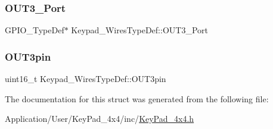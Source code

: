\subsubsection{\texorpdfstring{O\+U\+T3\+\_\+\+Port}{OUT3\_Port}}
{\footnotesize\ttfamily G\+P\+I\+O\+\_\+\+Type\+Def$\ast$ Keypad\+\_\+\+Wires\+Type\+Def\+::\+O\+U\+T3\+\_\+\+Port}

\mbox{\label{struct_keypad___wires_type_def_aaaa4c6e2944f027f8c7eb8d8bc0ee90c}} 
\subsubsection{\texorpdfstring{O\+U\+T3pin}{OUT3pin}}
{\footnotesize\ttfamily uint16\+\_\+t Keypad\+\_\+\+Wires\+Type\+Def\+::\+O\+U\+T3pin}



The documentation for this struct was generated from the following file\+:\begin{DoxyCompactItemize}
\item 
Application/\+User/\+Key\+Pad\+\_\+4x4/inc/\hyperlink{_key_pad__4x4_8h}{Key\+Pad\+\_\+4x4.\+h}\end{DoxyCompactItemize}
